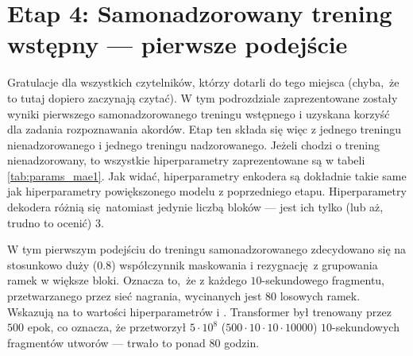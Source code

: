 \section{Etap 4: Samonadzorowany trening wstępny --- pierwsze podejście}

Gratulacje dla wszystkich czytelników, którzy dotarli do tego miejsca (chyba, że to tutaj dopiero zaczynają czytać). W tym podrozdziale zaprezentowane zostały wyniki pierwszego samonadzorowanego treningu wstępnego i uzyskana korzyść dla zadania rozpoznawania akordów. Etap ten składa się więc z jednego treningu nienadzorowanego i jednego treningu nadzorowanego. Jeżeli chodzi o trening nienadzorowany, to wszystkie hiperparametry zaprezentowane są w tabeli \ref{tab:params_mae1}. Jak widać, hiperparametry enkodera są dokładnie takie same jak hiperparametry powiększonego modelu z poprzedniego etapu. Hiperparametry dekodera różnią się natomiast jedynie liczbą bloków --- jest ich tylko (lub aż, trudno to ocenić) $3$. 

W tym pierwszym podejściu do treningu samonadzorowanego zdecydowano się na stosunkowo duży ($0.8$) współczynnik maskowania i rezygnację z grupowania ramek w większe bloki. Oznacza to, że z każdego $10$-sekundowego fragmentu, przetwarzanego przez sieć nagrania, wycinanych jest $80$ losowych ramek. Wskazują na to wartości hiperparametrów   i . Transformer był trenowany przez $500$ epok, co oznacza, że przetworzył $5 \cdot 10^8$ ($500 \cdot 10 \cdot 10 \cdot 10000$) $10$-sekundowych fragmentów utworów --- trwało to ponad $80$ godzin.


